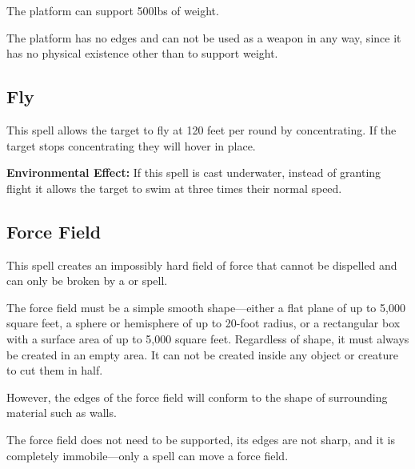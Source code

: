 \begin{multicols*}{2}
The platform can support 500lbs of weight.

The platform has no edges and can not be used as a weapon in any way, since it has no physical existence other than to support weight.

\subsection{Fly}\label{spell:Fly}

This spell allows the target to fly at 120 feet per round by concentrating. If the target stops concentrating they will hover in place.

\textbf{Environmental Effect:} If this spell is cast underwater, instead of granting flight it allows the target to swim at three times their normal speed.

\subsection{Force Field}\label{spell:Force Field}

This spell creates an impossibly hard field of force that cannot be dispelled and can only be broken by a  or  spell.

The force field must be a simple smooth shape—either a flat plane of up to 5,000 square feet, a sphere or hemisphere of up to 20-foot radius, or a rectangular box with a surface area of up to 5,000 square feet. Regardless of shape, it must always be created in an empty area. It can not be created inside any object or creature to cut them in half.

However, the edges of the force field will conform to the shape of surrounding material such as walls.

The force field does not need to be supported, its edges are not sharp, and it is completely immobile—only a  spell can move a force field.


\end{multicols*}
